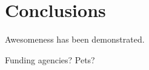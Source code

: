 \documentclass{article}
\begin{document}




\section{Conclusions}
Awesomeness has been demonstrated.

\nocite{*} %

\begin{acknowledgments}
Funding agencies? Pets?
\end{acknowledgments}


\end{document}
